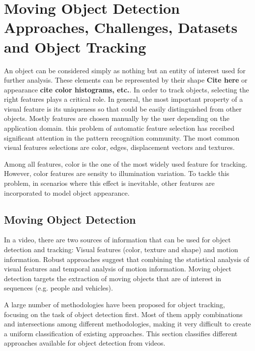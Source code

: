 
\chapter{Moving Object Detection Approaches, Challenges, Datasets and Object Tracking} %

\label{chapter2} %


An object can be considered simply as nothing but an entity of interest used for further analysis. These elements can be represented by their shape \textbf{Cite here} or appearance \textbf{cite color histograms, etc.}. In order to track objects, selecting the right features plays a critical role. In general, the most important property of a visual feature is its uniqueness so that could be easily distinguished from other objects. Mostly features are chosen manually by the user depending on the application domain. this problem of automatic feature selection has receibed significant attention in the pattern recognition community. The most common visual features selections are color, edges, displacement vectors and textures.

Among all features, color is the one of the most widely used feature for tracking. However, color features are sensity to illumination variation. To tackle this problem, in scenarios where this effect is inevitable, other features are incorporated to model object appearance.

\section{Moving Object Detection}

In a video, there are two sources of information that can be used for object detection and tracking: Visual features (color, texture and shape) and motion information. Robust approaches suggest that combining the statistical analysis of visual features and temporal analysis of motion information. Moving object detection targets the extraction of moving objects that are of interest in sequences (e.g. people and vehicles).

A large number of methodologies have been proposed for object tracking, focusing on the task of object detection first. Most of them  apply combinations and intersections among different methodologies, making it very difficult to create a uniform classification of existing approaches. This section classifies different approaches available for object detection from videos.

